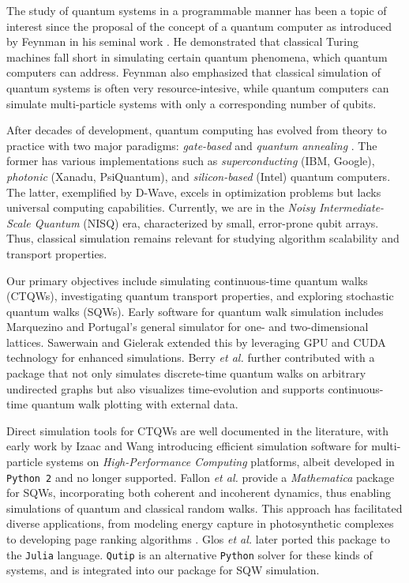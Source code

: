 \documentclass[main.tex]{subfiles}
\begin{document}
The study of quantum systems in a programmable manner has been a topic of
interest since the proposal of the concept of a quantum computer as introduced
by Feynman in his seminal work \cite{feynman1982}. He demonstrated that
classical Turing machines fall short in simulating certain quantum phenomena,
which quantum computers can address. Feynman also emphasized that classical
simulation of quantum systems is often very resource-intesive, while quantum
computers can simulate multi-particle systems with only a corresponding number
of qubits.

After decades of development, quantum computing has evolved from theory to
practice with two major paradigms: \textit{gate-based} and \textit{quantum
annealing} \cite{willschLecture22}. The former has various implementations such as 
\textit{superconducting} (IBM, Google), \textit{photonic} (Xanadu,
PsiQuantum), and \textit{silicon-based} (Intel) quantum computers. The latter,
exemplified by D-Wave, excels in optimization problems but lacks universal computing
capabilities. Currently, we are in the \textit{Noisy Intermediate-Scale
Quantum} (NISQ) era, characterized by small, error-prone qubit arrays. Thus,
classical simulation remains relevant for studying algorithm scalability and
transport properties.

Our primary objectives include simulating continuous-time quantum walks
(CTQWs), investigating quantum transport properties, and exploring stochastic
quantum walks (SQWs). Early software for quantum walk simulation includes
Marquezino and Portugal's \cite{marquezino2008} general simulator for one- and
two-dimensional lattices. Sawerwain and Gielerak \cite{sawerwain2010} extended
this by leveraging GPU and CUDA technology for enhanced simulations. Berry
\textit{et al.} \cite{berry2011} further contributed with a package that not
only simulates discrete-time quantum walks on arbitrary undirected graphs but
also visualizes time-evolution and supports continuous-time quantum walk
plotting with external data. 

Direct simulation tools for CTQWs are well documented in the literature, with
early work by Izaac and Wang \cite{izaac2015} introducing efficient simulation
software for multi-particle systems on \textit{High-Performance Computing}
platforms, albeit developed in \texttt{Python 2} and no longer supported.
Fallon \textit{et al.} \cite{falloon2017a} provide a \textit{Mathematica}
package for SQWs, incorporating both coherent and incoherent dynamics, thus
enabling simulations of quantum and classical random walks. This approach has
facilitated diverse applications, from modeling energy capture in
photosynthetic complexes \cite{mohseni08} to developing page ranking algorithms
\cite{SanchezBurillo2012}. Glos \textit{et al.} \cite{glos2018}
later ported this package to the \texttt{Julia} language. \texttt{Qutip}
\cite{Johansson2011,Johansson2012} is an alternative \texttt{Python} solver for
these kinds of systems, and is integrated into our package for SQW simulation.
\end{document}

